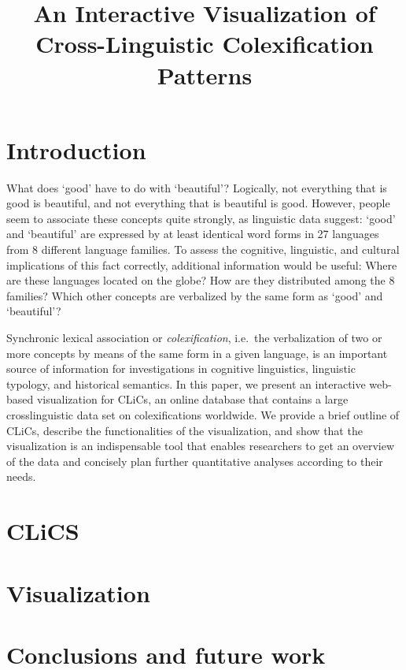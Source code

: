 \documentclass[10pt, a4paper]{article}
\title{An Interactive Visualization of Cross-Linguistic Colexification Patterns}
\begin{document}
\maketitleabstract

\section{Introduction}

What does `good' have to do with `beautiful'? Logically, not everything that is good is beautiful, and not everything that is beautiful is good. However, people seem to associate these concepts quite strongly, as linguistic data suggest: `good' and `beautiful' are expressed by at least identical word forms in 27 languages from 8 different language families. To assess the cognitive, linguistic, and cultural implications of this fact correctly, additional information would be useful: Where are these languages located on the globe? How are they distributed among the 8 families? Which other concepts are verbalized by the same form as `good' and `beautiful'?

Synchronic lexical association or \textsl{colexification}, i.e.~the verbalization of two or more concepts by means of the same form in a given language, is an important source of information for investigations in cognitive linguistics, linguistic typology, and historical semantics. In this paper, we present an interactive web-based visualization for CLiCs, an online database that contains a large crosslinguistic data set on colexifications worldwide. We provide a brief outline of CLiCs, describe the functionalities of the visualization, and show that the visualization is an indispensable tool that enables researchers to get an overview of the data and concisely plan further quantitative analyses according to their needs.

\section{CLiCS}



\section{Visualization}



\section{Conclusions and future work}
\end{document}
